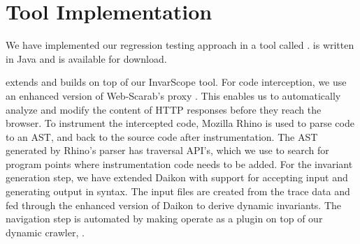 \section{Tool Implementation}
\label{Sec:tool}
We have implemented our \javascript regression testing approach in a tool called \jsart.
\jsart is written in Java and is available for download.


\jsart extends and builds on top of our InvarScope \cite{groenevel:tech10} tool. For \javascript code interception, we use an enhanced version of Web-Scarab's proxy \cite{bezemer:esec09}. 
This enables us to automatically analyze and modify the content of HTTP responses before they reach the browser. To instrument the intercepted code, Mozilla Rhino is used to parse \javascript code to an AST, and back to the source code after instrumentation. The AST generated by Rhino's parser has 
traversal API's, which we use to search for program points where instrumentation code needs to be added. 
For the invariant generation step, we have extended Daikon \cite{ernst2007daikon} with support for accepting input and generating output in \javascript syntax. The input files are created from the trace data and fed through the enhanced version of Daikon to derive dynamic invariants.
The navigation step is automated by making \jsart operate as a plugin on top of our dynamic \ajax crawler, \crawljax \cite{mesbah:tweb11}.





